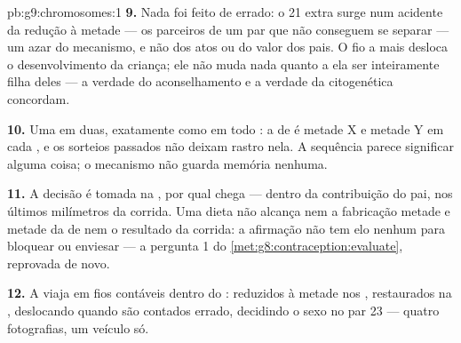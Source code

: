 \begin{solution}{pb:g9:chromosomes:1}
\textbf{9.} Nada foi feito de errado: o 21 extra surge num
acidente da redução à metade --- os parceiros de um par que
não conseguem se separar --- um azar do mecanismo, e não dos
atos ou do valor dos pais. O fio a mais desloca o
desenvolvimento da criança; ele não muda nada quanto a ela
ser inteiramente filha deles --- a verdade do aconselhamento
e a verdade da citogenética concordam.

\textbf{10.} Uma em duas, exatamente como em todo
: a  de  é metade X e
metade Y em cada , e os sorteios passados não
deixam rastro nela. A sequência parece significar alguma
coisa; o mecanismo não guarda memória nenhuma.

\textbf{11.} A decisão é tomada na , por qual
 chega --- dentro da contribuição do pai, nos
últimos milímetros da corrida. Uma dieta não alcança nem a
fabricação metade e metade da  de 
nem o resultado da corrida: a afirmação não tem elo nenhum
para bloquear ou enviesar --- a pergunta 1 do
\cref{met:g8:contraception:evaluate}, reprovada de novo.

\textbf{12.} A  viaja em fios contáveis
dentro do : reduzidos à metade nos ,
restaurados na , deslocando  quando
são contados errado, decidindo o sexo no par 23 --- quatro
fotografias, um veículo só.
\end{solution}
